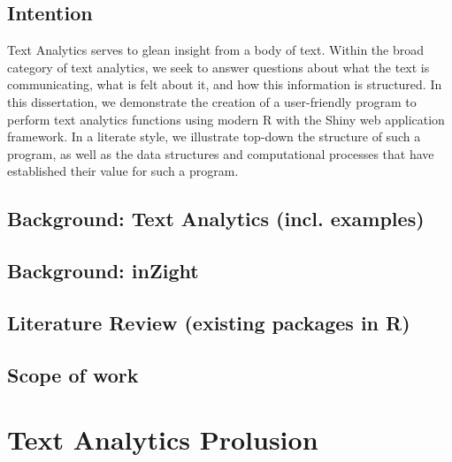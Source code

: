 \documentclass[11pt, a4paper, oneside]{report}
\begin{document}
\section{Intention}
\label{sec:intention}

Text Analytics serves to glean insight from a body of text. Within the
broad category of text analytics, we seek to answer questions about
what the text is communicating, what is felt about it, and how this
information is structured. In this dissertation, we demonstrate the
creation of a user-friendly program to perform text analytics
functions using modern R with the Shiny web application framework. In
a literate style, we illustrate top-down the structure of such a
program, as well as the data structures and computational processes
that have established their value for such a program.
  
\section{Background: Text Analytics (incl. examples)}
\label{sec:backgr-text-analyt}


\section{Background: inZight}
\label{sec:background:-inzight}

\section{Literature Review (existing packages in R)}
\label{sec:liter-revi-exist}


\section{Scope of work}
\label{sec:scope-work}


\chapter{Text Analytics Prolusion}
\label{cha:text-analyt-backgr}
\end{document}
